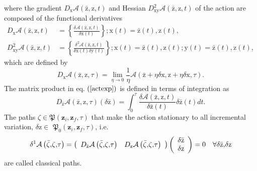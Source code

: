 \documentclass[aps,preprint]{revtex4}%
\begin{document}
where the gradient $D_{\mathrm{x}}\mathcal{A}\left(  \mathrm{\bar{z}%
},\mathrm{z}\mathbf{,}t\right)  $ and Hessian $D_{\mathrm{xy}}^{2}%
\mathcal{A}\left(  \mathrm{\bar{z}},\mathrm{z}\mathbf{,}t\right)  $ of the
action are composed of the functional derivatives
\begin{align}
D_{\mathrm{x}}\mathcal{A}\left(  \mathrm{\bar{z}},\mathrm{z}\mathbf{,}%
t\right)   &  =\left\{  \frac{\delta\mathcal{A}\left(  \mathrm{\bar{z}%
},\mathrm{z}\mathbf{,}t\right)  }{\delta\mathrm{x}\left(  t\right)  }\right\}
;\mathrm{x}\left(  t\right)  =\mathrm{\bar{z}}\left(  t\right)  ,\mathrm{z}%
\left(  t\right)  ,\nonumber\\
D_{\mathrm{xy}}^{2}\mathcal{A}\left(  \mathrm{\bar{z}},\mathrm{z}%
\mathbf{,}t\right)   &  =\left\{  \frac{\delta^{2}\mathcal{A}\left(
\mathrm{\bar{z}},\mathrm{z}\mathbf{,}t\right)  }{\delta\mathrm{x}\left(
t\right)  \delta\mathrm{y}\left(  t\right)  }\right\}  ;\mathrm{x}\left(
t\right)  =\mathrm{\bar{z}}\left(  t\right)  ,\mathrm{z}\left(  t\right)
;\mathrm{y}\left(  t\right)  =\mathrm{\bar{z}}\left(  t\right)  ,\mathrm{z}%
\left(  t\right)  ,
\end{align}
which are defined by
\begin{equation}
D_{\mathrm{x}}\mathcal{A}\left(  \mathrm{\bar{z}},\mathrm{z}\mathbf{,}%
\tau\right)  =\lim_{\eta\rightarrow0}\frac{1}{\eta}\mathcal{A}\left(
\mathrm{\bar{z}}+\eta\delta\mathrm{x},\mathrm{z}+\eta\delta\mathrm{x}%
\mathbf{,}\tau\right)  .
\end{equation}
The matrix product in eq. $\left(  \ref{actexp}\right)  $ is defined in terms
of integration as
\begin{equation}
D_{\mathrm{\bar{z}}}\mathcal{A}\left(  \mathrm{\bar{z}},\mathrm{z}%
\mathbf{,}\tau\right)  \left(  \delta\mathrm{\bar{z}}\right)  =\int_{0}^{\tau
}\frac{\delta\mathcal{A}\left(  \mathrm{\bar{z}},\mathrm{z}\mathbf{,}t\right)
}{\delta\mathrm{\bar{z}}\left(  t\right)  }\delta\mathrm{\bar{z}}\left(
t\right)  dt.
\end{equation}
The paths $\zeta\in\mathfrak{P}\left(  \mathbf{z}_{i},\mathbf{z}_{f}%
,\tau\right)  $ that make the action stationary to all incremental variation,
$\delta\mathrm{z}\in$ $\mathfrak{P}_{0}\left(  \mathbf{z}_{i},\mathbf{z}%
_{f},\tau\right)  $, i.e.%
\begin{equation}
\delta^{1}\mathcal{A}\left(  \bar{\zeta}\mathbf{,}\zeta\mathbf{,}\tau\right)
=\left(
\begin{array}
[c]{cc}%
D_{\mathrm{\bar{z}}}\mathcal{A}\left(  \bar{\zeta}\mathbf{,}\zeta
\mathbf{,}\tau\right)  & D_{\mathrm{z}}\mathcal{A}\left(  \bar{\zeta
}\mathbf{,}\zeta\mathbf{,}\tau\right)
\end{array}
\right)  \left(
\begin{array}
[c]{c}%
\delta\mathrm{\bar{z}}\\
\delta\mathrm{z}%
\end{array}
\right)  =0\quad\forall\delta\mathrm{\bar{z},}\delta\mathrm{z}%
\end{equation}
are called classical paths.
\end{document}
